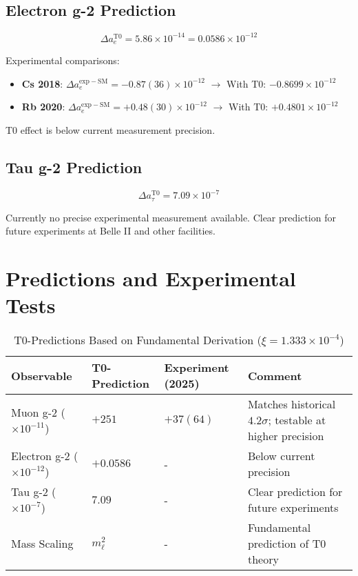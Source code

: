 \documentclass[12pt,a4paper]{article}
\begin{document}
	\subsection{Electron g-2 Prediction}
	
	\begin{equation}
		\Delta a_e^{\mathrm{T0}} = 5.86 \times 10^{-14} = 0.0586 \times 10^{-12}
	\end{equation}
	
	\begin{verification}
		Experimental comparisons:
		\begin{itemize}
			\item \textbf{Cs 2018}: $\Delta a_e^{\mathrm{exp-SM}} = -0.87(36) \times 10^{-12}$ $\rightarrow$ With T0: $-0.8699 \times 10^{-12}$
			\item \textbf{Rb 2020}: $\Delta a_e^{\mathrm{exp-SM}} = +0.48(30) \times 10^{-12}$ $\rightarrow$ With T0: $+0.4801 \times 10^{-12}$
		\end{itemize}
		T0 effect is below current measurement precision.
	\end{verification}
	
	\subsection{Tau g-2 Prediction}
	
	\begin{equation}
		\Delta a_\tau^{\mathrm{T0}} = 7.09 \times 10^{-7}
	\end{equation}
	
	\begin{verification}
		Currently no precise experimental measurement available. Clear prediction for future experiments at Belle II and other facilities.
	\end{verification}
	
	\section{Predictions and Experimental Tests}
	
	\begin{table}[htbp]
		\centering
		\footnotesize
		\begin{tabular}{L{2.5cm}C{2cm}C{2cm}L{3.5cm}}
			\toprule
			\textbf{Observable} & \textbf{T0-Prediction} & \textbf{Experiment (2025)} & \textbf{Comment} \\
			\midrule
			Muon g-2 ($\times 10^{-11}$) & $+251$ & $+37(64)$ & Matches historical $4.2\sigma$; testable at higher precision \\
			Electron g-2 ($\times 10^{-12}$) & $+0.0586$ & - & Below current precision \\
			Tau g-2 ($\times 10^{-7}$) & $7.09$ & - & Clear prediction for future experiments \\
			Mass Scaling & $m_\ell^2$ & - & Fundamental prediction of T0 theory \\
			\bottomrule
		\end{tabular}
		\caption{T0-Predictions Based on Fundamental Derivation ($\xi = 1.333 \times 10^{-4}$)}
		\label{tab:predictions}
	\end{table}
	
\end{document}
